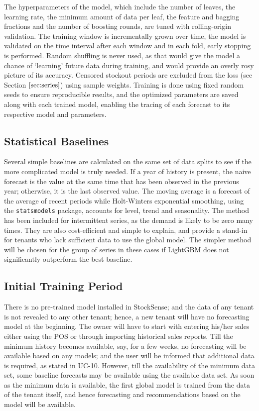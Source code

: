 \documentclass{StockSense}
\begin{document}
The hyperparameters of the model, which include the number of leaves, the learning rate, the minimum amount of data per leaf, the feature and bagging fractions and the number of boosting rounds, are tuned with rolling-origin validation. The training window is incrementally grown over time, the model is validated on the time interval after each window and in each fold, early stopping is performed. Random shuffling is never used, as that would give the model a chance of ‘learning' future data during training, and would provide an overly rosy picture of its accuracy. Censored stockout periods are excluded from the loss (see Section $\ref{sec:series}$) using sample weights. Training is done using fixed random seeds to ensure reproducible results, and the optimized parameters are saved along with each trained model, enabling the tracing of each forecast to its respective model and parameters.

\subsection{Statistical Baselines}

Several simple baselines are calculated on the same set of data splits to see if the more complicated model is truly needed. If a year of history is present, the naive forecast is the value at the same time that has been observed in the previous year; otherwise, it is the last observed value. The moving average is a forecast of the average of recent periods while Holt-Winters exponential smoothing, using the \texttt{statsmodels} package, accounts for level, trend and seasonality. The method has been included for intermittent series, as the demand is likely to be zero many times. They are also cost-efficient and simple to explain, and provide a stand-in for tenants who lack sufficient data to use the global model. The simpler method will be chosen for the group of series in these cases if LightGBM does not significantly outperform the best baseline.

\subsection{Initial Training Period}

There is no pre-trained model installed in StockSense; and the data of any tenant is not revealed to any other tenant; hence, a new tenant will have no forecasting model at the beginning. The owner will have to start with entering his/her sales either using the POS or through importing historical sales reports. Till the minimum history becomes available, say, for a few weeks, no forecasting will be available based on any models; and the user will be informed that additional data is required, as stated in UC-10. However, till the availability of the minimum data set, some baseline forecasts may be available using the available data set. As soon as the minimum data is available, the first global model is trained from the data of the tenant itself, and hence forecasting and recommendations based on the model will be available.
\end{document}

